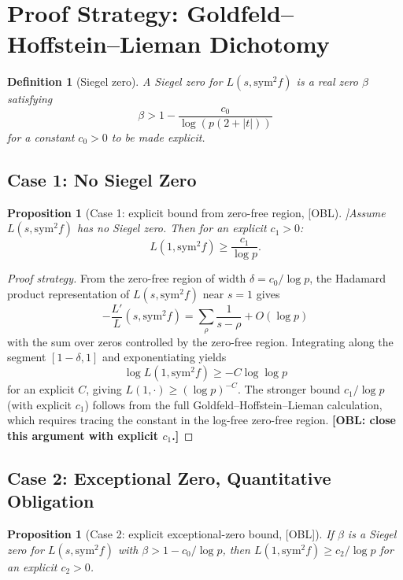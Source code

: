 \documentclass[12pt]{article}
\newtheorem{proposition}[theorem]{Proposition}
\newtheorem{definition}[theorem]{Definition}
\begin{document}
\section{Proof Strategy: Goldfeld--Hoffstein--Lieman Dichotomy}

\begin{definition}[Siegel zero]
A Siegel zero for $L(s, \mathrm{sym}^2 f)$ is a real zero $\beta$ satisfying
\[
  \beta > 1 - \frac{c_0}{\log(p(2+|t|))}
\]
for a constant $c_0 > 0$ to be made explicit.
\end{definition}

\subsection{Case 1: No Siegel Zero}

\begin{proposition}[Case 1: explicit bound from zero-free region, [OBL]]\label{prop:case1}
Assume $L(s, \mathrm{sym}^2 f)$ has no Siegel zero.  Then for an explicit $c_1 > 0$:
\[
  L(1, \mathrm{sym}^2 f) \geq \frac{c_1}{\log p}.
\]
\end{proposition}

\begin{proof}[Proof strategy]
From the zero-free region of width $\delta = c_0/\log p$, the Hadamard product
representation of $L(s, \mathrm{sym}^2 f)$ near $s = 1$ gives
\[
  -\frac{L'}{L}(s, \mathrm{sym}^2 f) = \sum_\rho \frac{1}{s-\rho} + O(\log p)
\]
with the sum over zeros controlled by the zero-free region.  Integrating along the
segment $[1-\delta, 1]$ and exponentiating yields
\[
  \log L(1, \mathrm{sym}^2 f) \geq -C \log\log p
\]
for an explicit $C$, giving $L(1, \cdot) \geq (\log p)^{-C}$.  The stronger bound
$c_1/\log p$ (with explicit $c_1$) follows from the full Goldfeld--Hoffstein--Lieman
calculation, which requires tracing the constant in the log-free zero-free region.
\textbf{[OBL: close this argument with explicit $c_1$.]}
\end{proof}

\subsection{Case 2: Exceptional Zero, Quantitative Obligation}

\begin{proposition}[Case 2: explicit exceptional-zero bound, {[OBL]}]\label{prop:case2}
If $\beta$ is a Siegel zero for $L(s, \mathrm{sym}^2 f)$ with $\beta > 1 - c_0/\log p$,
then $L(1, \mathrm{sym}^2 f) \geq c_2/\log p$ for an explicit $c_2 > 0$.
\end{proposition}
\end{document}
